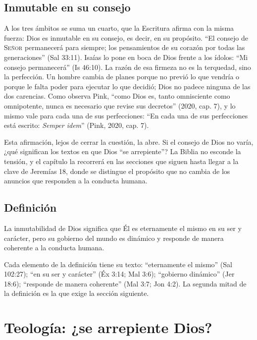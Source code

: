 \documentclass[11pt,letterpaper]{article}
\newcommand{\SENOR}{\textsc{Señor}}
\begin{document}
\subsection{Inmutable en su consejo}
A los tres ámbitos se suma un cuarto, que la Escritura afirma con la misma fuerza: Dios es inmutable en su consejo, es decir, en su propósito. ``El consejo de \SENOR{} permanecerá para siempre; los pensamientos de su corazón por todas las generaciones'' (Sal 33:11). Isaías lo pone en boca de Dios frente a los ídolos: ``Mi consejo permanecerá'' (Is 46:10). La razón de esa firmeza no es la terquedad, sino la perfección. Un hombre cambia de planes porque no previó lo que vendría o porque le falta poder para ejecutar lo que decidió; Dios no padece ninguna de las dos carencias. Como observa Pink, ``como Dios es, tanto omnisciente como omnipotente, nunca es necesario que revise sus decretos'' (2020, cap. 7), y lo mismo vale para cada una de sus perfecciones: ``En cada una de sus perfecciones está escrito: \emph{Semper idem}'' (Pink, 2020, cap. 7).

Esta afirmación, lejos de cerrar la cuestión, la abre. Si el consejo de Dios no varía, ¿qué significan los textos en que Dios ``se arrepiente''? La Biblia no esconde la tensión, y el capítulo la recorrerá en las secciones que siguen hasta llegar a la clave de Jeremías 18, donde se distingue el propósito que no cambia de los anuncios que responden a la conducta humana.

\subsection{Definición}
\begin{tcolorbox}[colback=papiro,colframe=azul,boxrule=1pt,arc=3pt,title={Definición teológica bíblica},colbacktitle=azul,coltitle=papiro]
La inmutabilidad de Dios significa que Él es eternamente el mismo en su ser y carácter, pero su gobierno del mundo es dinámico y responde de manera coherente a la conducta humana.
\end{tcolorbox}

Cada elemento de la definición tiene su texto: ``eternamente el mismo'' (Sal 102:27); ``en su ser y carácter'' (Éx 3:14; Mal 3:6); ``gobierno dinámico'' (Jer 18:6); ``responde de manera coherente'' (Mal 3:7; Jon 4:2). La segunda mitad de la definición es la que exige la sección siguiente.

\section{Teología: ¿se arrepiente Dios?}
\end{document}
